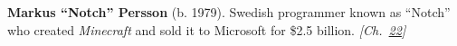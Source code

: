 \textbf{Markus ``Notch'' Persson} (b. 1979). Swedish programmer known as ``Notch'' who created \emph{Minecraft} and sold it to Microsoft for \$2.5 billion. \emph{[Ch.~\hyperref[ch:minecraftcreeper]{22}]}

